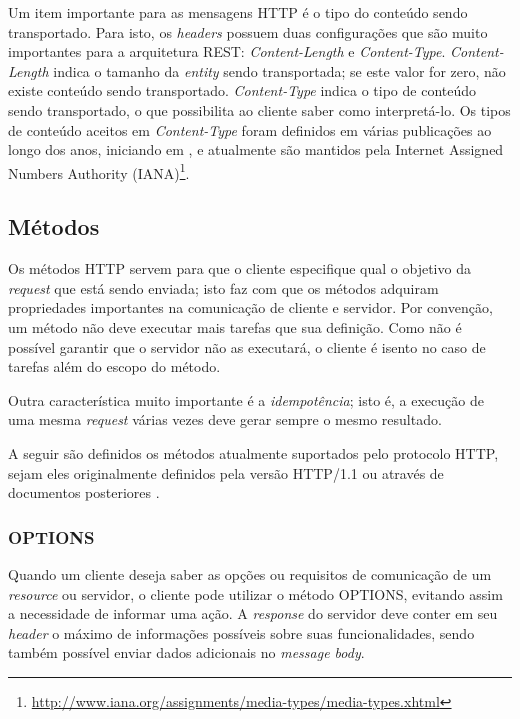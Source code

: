 Um item importante para as mensagens HTTP é o tipo do conteúdo sendo transportado. Para isto, os \textit{headers} possuem duas configurações que são muito importantes para a arquitetura REST: \textit{Content-Length} e \textit{Content-Type}. \textit{Content-Length} indica o tamanho da \textit{entity} sendo transportada; se este valor for zero, não existe conteúdo sendo transportado. \textit{Content-Type} indica o tipo de conteúdo sendo transportado, o que possibilita ao cliente saber como interpretá-lo. Os tipos de conteúdo aceitos em \textit{Content-Type} foram definidos em várias publicações ao longo dos anos, iniciando em , e atualmente são mantidos pela Internet Assigned Numbers Authority (IANA)\footnote{\url{http://www.iana.org/assignments/media-types/media-types.xhtml}}.


\subsection{Métodos}
\label{sec:http:meth}
Os métodos HTTP servem para que o cliente especifique qual o objetivo da \textit{request} que está sendo enviada; isto faz com que os métodos adquiram propriedades importantes na comunicação de cliente e servidor. Por convenção, um método não deve executar mais tarefas que sua definição. Como não é possível garantir que o servidor não as executará, o cliente é isento no caso de tarefas além do escopo do método.

Outra característica muito importante é a \textit{idempotência}; isto é, a execução de uma mesma \textit{request} várias vezes deve gerar sempre o mesmo resultado.

A seguir são definidos os métodos atualmente suportados pelo protocolo HTTP, sejam eles originalmente definidos pela versão HTTP/1.1 ou através de documentos posteriores \cite{RFC7231}.



\subsubsection{OPTIONS}
Quando um cliente deseja saber as opções ou requisitos de comunicação de um \textit{resource} ou servidor, o cliente pode utilizar o método OPTIONS, evitando assim a necessidade de informar uma ação. A \textit{response} do servidor deve conter em seu \textit{header} o máximo de informações possíveis sobre suas funcionalidades, sendo também possível enviar dados adicionais no \textit{message body}.

